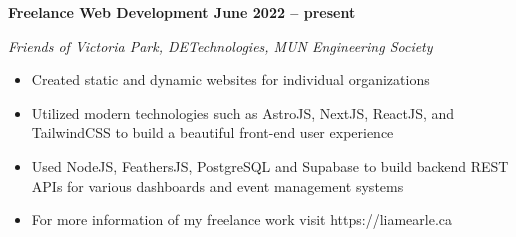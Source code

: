 \vspace{0.1cm}
\textbf{Freelance Web Development \hfill June 2022 -- present} \par
\textit{Friends of Victoria Park, DETechnologies, MUN Engineering Society} \par
\begin{itemize}
    \item Created static and dynamic websites for individual organizations
    \item Utilized modern technologies such as AstroJS, NextJS, ReactJS, and TailwindCSS to build a beautiful front-end user experience
    \item Used NodeJS, FeathersJS, PostgreSQL and Supabase to build backend REST APIs for various dashboards and event management systems
    \item For more information of my freelance work visit https://liamearle.ca
\end{itemize} \par